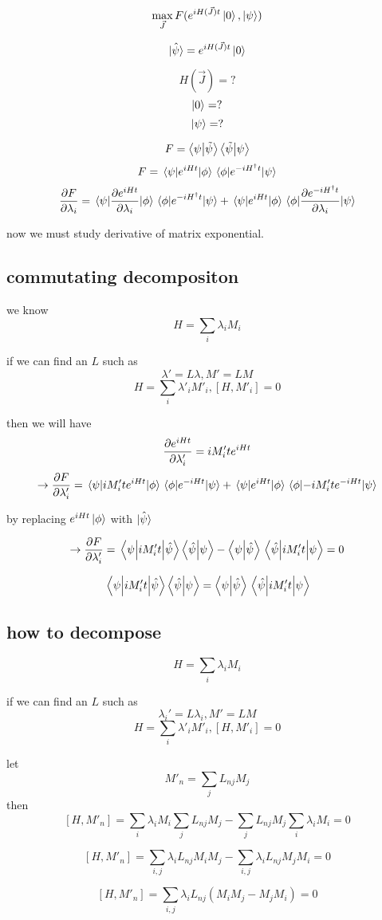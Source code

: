 \documentclass[11pt]{article}
\begin{document}
\[ \max_{\vec{J}} F(e^{iH(\vec{J})t} \ket{0}, \ket{\psi}) \]

\[ \hat{\ket{\psi}} = e^{iH(\vec{J})t} \ket{0} \]


\[ H(\vec{J}) = ? \]
\[ \ket{0} = ? \]
\[ \ket{\psi} = ? \]


\[ F = \braket{\psi}{\tilde\psi} \braket{\tilde\psi}{\psi}\]
\[ F = \mel{\psi}{e^{iHt}}{\phi} 
\mel{\phi}{e^{-iH^\dagger t}}{\psi}
\]
\[ \pdv{F}{\lambda_i} = \mel{\psi}{\pdv{e^{iHt}}{\lambda_i}}{\phi} 
\mel{\phi}{e^{-iH^\dagger t}}{\psi} + \mel{\psi}{e^{iHt}}{\phi} 
\mel{\phi}{\pdv{e^{-iH^\dagger t}}{\lambda_i}}{\psi} \]

now we must study derivative of matrix exponential.

\subsection{commutating decompositon}

we know
\[ H = \sum_i \lambda_i M_i \]

if we can find an $L$ such as
\[ \lambda' = L\lambda, M' = LM \]
\[ H = \sum_i \lambda'_i M'_i, [H, M'_i] = 0 \]

then we will have
\[ \pdv{e^{iHt}}{\lambda'_i} = iM'_it e^{iHt} \]
\[ \rightarrow \pdv{F}{\lambda'_i} = \mel{\psi}{iM'_ite^{iHt}}{\phi} 
\mel{\phi}{e^{-iH t}}{\psi} + \mel{\psi}{e^{iHt}}{\phi} 
\mel{\phi}{-iM'_it e^{-iH t}}{\psi} \]

by replacing $e^{iHt}\ket{\phi}$ with $\hat{\ket{\psi}}$

\[ \rightarrow \pdv{F}{\lambda'_i} = \mel{\psi}{iM'_it}{\hat{\psi}}  \braket{\hat{\psi}}{\psi} - \braket{\psi}{\hat{\psi}}\mel{\hat{\psi}}{iM'_it}{\psi}  = 0 \]

\[ \mel{\psi}{iM'_it}{\hat{\psi}}  \braket{\hat{\psi}}{\psi} = \braket{\psi}{\hat{\psi}}\mel{\hat{\psi}}{iM'_it}{\psi} \]

\subsection{how to decompose}

\[ H = \sum_i \lambda_i M_i \]

if we can find an $L$ such as
\[ \lambda_i' = L\lambda_i, M' = LM \]
\[ H = \sum_i \lambda'_i M'_i, [H, M'_i] = 0 \]

let 
\[ M'_n = \sum_j L_{nj} M_j \]
then
\[ [H, M'_n] = \sum_i \lambda_i M_i \sum_j L_{nj} M_j - \sum_j L_{nj} M_j \sum_i \lambda_i M_i = 0 \]

\[ [H, M'_n] = \sum_{i, j} \lambda_i L_{nj} M_i M_j - \sum_{i, j} \lambda_i L_{nj} M_j M_i = 0 \]

\[ [H, M'_n] = \sum_{i, j} \lambda_i L_{nj}(M_i M_j - M_j M_i) = 0 \]
\end{document}
